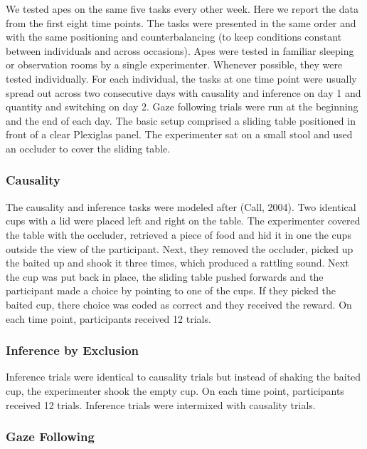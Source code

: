 \documentclass[10pt, letterpaper]{article}
\begin{document}
We tested apes on the same five tasks every other week. Here we report
the data from the first eight time points. The tasks were presented in
the same order and with the same positioning and counterbalancing (to
keep conditions constant between individuals and across occasions). Apes
were tested in familiar sleeping or observation rooms by a single
experimenter. Whenever possible, they were tested individually. For each
individual, the tasks at one time point were usually spread out across
two consecutive days with causality and inference on day 1 and quantity
and switching on day 2. Gaze following trials were run at the beginning
and the end of each day. The basic setup comprised a sliding table
positioned in front of a clear Plexiglas panel. The experimenter sat on
a small stool and used an occluder to cover the sliding table.

\hypertarget{causality}{%
\subsubsection{Causality}\label{causality}}

The causality and inference tasks were modeled after (Call, 2004). Two
identical cups with a lid were placed left and right on the table. The
experimenter covered the table with the occluder, retrieved a piece of
food and hid it in one the cups outside the view of the participant.
Next, they removed the occluder, picked up the baited up and shook it
three times, which produced a rattling sound. Next the cup was put back
in place, the sliding table pushed forwards and the participant made a
choice by pointing to one of the cups. If they picked the baited cup,
there choice was coded as correct and they received the reward. On each
time point, participants received 12 trials.

\hypertarget{inference-by-exclusion}{%
\subsubsection{Inference by Exclusion}\label{inference-by-exclusion}}

Inference trials were identical to causality trials but instead of
shaking the baited cup, the experimenter shook the empty cup. On each
time point, participants received 12 trials. Inference trials were
intermixed with causality trials.

\hypertarget{gaze-following}{%
\subsubsection{Gaze Following}\label{gaze-following}}
\end{document}
